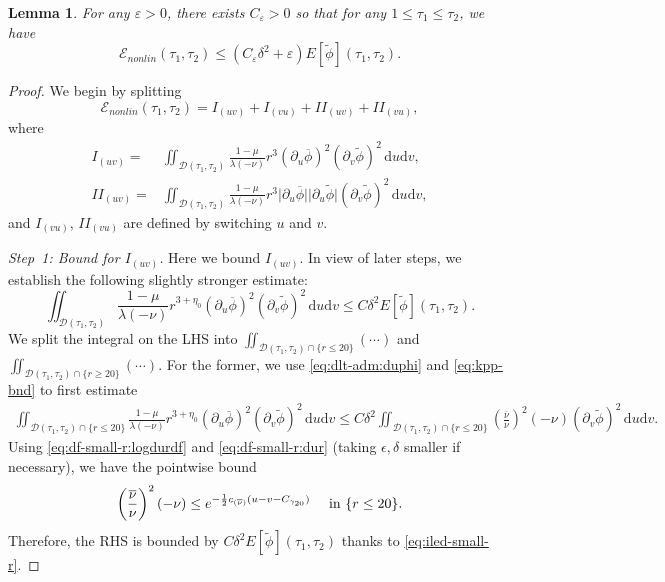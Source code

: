\documentclass[10pt, reqno]{amsart}
\newtheorem{lemma}[theorem]{Lemma}
\theoremstyle{definition}
\theoremstyle{remark}
\theoremstyle{conjecture}
\numberwithin{equation}{section}
\newcommand{\abs}[1]{\vert#1\vert}
\newcommand{\set}[1]{\{#1\}}
\newcommand{\ud}{\mathrm{d}}
\newcommand{\rd}{\partial}
\newcommand{\0}{\emptyset}
\newcommand{\gmm}{\gamma}
\newcommand{\dlt}{\delta}
\newcommand{\eps}{\epsilon}
\newcommand{\veps}{\varepsilon}
\newcommand{\lmb}{\lambda}
\newcommand{\calD}{\mathcal D}
\newcommand{\calE}{\mathcal E}
\newcommand{\dur}{\nu}
\newcommand{\dvr}{\lmb}
\newcommand{\pfstep}[1]{\vspace{.5em} {\it \noindent #1.}}
\newcommand{\phibg}{\overline{\phi}}				%
\newcommand{\durbg}{\overline{\dur}}				%
\newcommand{\phidf}{\widetilde{\phi}}				%
\begin{document}
\begin{lemma} \label{lem:en-err-nonlin}
For any $\veps > 0$, there exists $C_{\veps} > 0$ so that for any $1 \leq \tau_{1} \leq \tau_{2}$, we have
\begin{equation} \label{eq:en-err-nonlin}
	\calE_{nonlin}(\tau_{1}, \tau_{2}) \leq ( C_{\veps} \dlt^{2}  + \veps ) E[\phidf](\tau_{1}, \tau_{2}).
\end{equation}
\end{lemma}
\begin{proof}
We begin by splitting
\begin{equation*}
	\calE_{nonlin}(\tau_{1}, \tau_{2}) = I_{(uv)} + I_{(vu)} + II_{(uv)} + II_{(vu)},
\end{equation*}
where
\begin{align*}
	I_{(uv)} = & \iint_{\calD(\tau_{1}, \tau_{2})} \frac{1-\mu}{\dvr(-\dur)} r^{3} (\rd_{u} \phibg)^{2}  (\rd_{v} \phidf)^{2} \, \ud u \ud v, \\
	II_{(uv)} = & \iint_{\calD(\tau_{1}, \tau_{2})} \frac{1-\mu}{\dvr(-\dur)} r^{3} \abs{\rd_{u} \phibg} \abs{\rd_{u} \phidf}  (\rd_{v} \phidf)^{2} \, \ud u \ud v,
\end{align*}
and $I_{(vu)}$, $II_{(vu)}$ are defined by switching $u$ and $v$. 

\pfstep{Step~1: Bound for $I_{(uv)}$}
Here we bound $I_{(uv)}$. In view of later steps, we establish the following slightly stronger estimate:
\begin{equation} \label{eq:en-err-Iuv}
	\iint_{\calD(\tau_{1}, \tau_{2})} \frac{1-\mu}{\dvr(-\dur)} r^{3+\eta_{0}} (\rd_{u} \phibg)^{2}  (\rd_{v} \phidf)^{2} \, \ud u \ud v
	\leq C \dlt^{2} E[\phidf](\tau_{1}, \tau_{2}).
\end{equation}
We split the integral on the LHS into $\iint_{\calD(\tau_{1}, \tau_{2}) \cap \set{r \leq 20}} (\cdots)$ and $\iint_{\calD(\tau_{1}, \tau_{2}) \cap \set{r \geq 20}} (\cdots)$. For the former, we use \eqref{eq:dlt-adm:duphi} and \eqref{eq:kpp-bnd} to first estimate
\begin{align*}
	\iint_{\calD(\tau_{1}, \tau_{2}) \cap \set{r \leq 20}} \frac{1-\mu}{\dvr(-\dur)} r^{3+\eta_{0}} (\rd_{u} \phibg)^{2}  (\rd_{v} \phidf)^{2} \, \ud u \ud v
	\leq C \dlt^{2} \iint_{\calD(\tau_{1}, \tau_{2}) \cap \set{r \leq 20}} \left(\frac{\durbg}{\dur}\right)^{2} (-\dur) (\rd_{v} \phidf)^{2} \, \ud u \ud v.
\end{align*}
Using \eqref{eq:df-small-r:logdurdf} and \eqref{eq:df-small-r:dur} (taking $\eps, \dlt$ smaller if necessary), we have the pointwise bound 
\begin{equation*}
\left( \frac{\durbg}{\dur} \right)^{2} (-\dur) \leq e^{-\frac{1}{2} c_{(\durbg)}(u - v - C_{\gmm_{20}})} \quad \hbox{ in }\set{r \leq 20}. 
\end{equation*}
Therefore, the RHS is bounded by $C \dlt^{2} E[\phidf](\tau_{1}, \tau_{2})$ thanks to \eqref{eq:iled-small-r}.


\end{proof}
\end{document}
